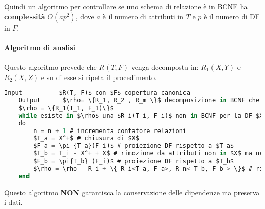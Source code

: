 Quindi un algoritmo per controllare se uno schema di relazione è in BCNF ha \textbf{complessità} $O(ap^2)$, dove $a$ è il numero di attributi in $T$ e $p$ è il numero di DF in $F$.

\paragraph{Algoritmo di analisi}
Questo algoritmo prevede che $R(T, F)$ venga decomposta in: $R_1(X, Y)$ e $R_2(X, Z)$ e su di esse si ripeta il procedimento.
\begin{lstlisting}[language=SQL, mathescape]
	Input		   $R(T, F)$ con $F$ copertura canonica
	Output		$\rho= \{R_1, R_2 , R_m \}$ decomposizione in BCNF che preserva i dati
	$\rho = \{R_1(T_1, F_1)\}$
	while esiste in $\rho$ una $R_i(T_i, F_i)$ non in BCNF per la DF $X \to A$
	do
		n = n + 1 # incrementa contatore relazioni
		$T_a = X^+$ # chiusura di $X$
		$F_a = \pi_{T_a}(F_i)$ # proiezione DF rispetto a $T_a$
		$T_b = T_i - X^+ + X$ # rimozione da attributi non in $X$ ma nella sua chiusura
		$F_b = \pi{T_b} (F_i)$ # proiezione DF rispetto a $T_b$
		$\rho = \rho - R_i + \{ R_i<T_a, F_a>, R_n< T_b, F_b > \}$ # rimuove $R$ non BCNF per $X \to A$ e inserisce quelle corrette
	end
\end{lstlisting}
Questo algoritmo \textbf{NON} garantisca la conservazione delle dipendenze ma preserva i dati.


